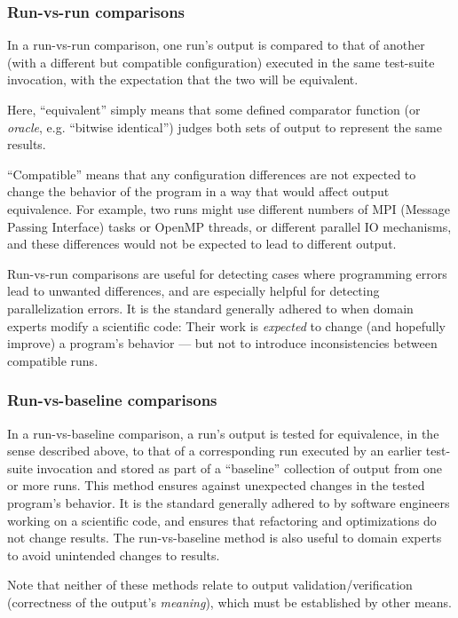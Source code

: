 \documentclass[conference]{IEEEtran}
\begin{document}
\subsubsection{Run-vs-run comparisons}

In a run-vs-run comparison, one run's output is compared to that of another (with a different but compatible configuration) executed in the same test-suite invocation, with the expectation that the two will be equivalent.

Here, ``equivalent'' simply means that some defined comparator function (or \emph{oracle}, e.g. ``bitwise identical'') judges both sets of output to represent the same results.

``Compatible'' means that any configuration differences are not expected to change the behavior of the program in a way that would affect output equivalence. For example, two runs might use different numbers of MPI (Message Passing Interface) tasks or OpenMP threads, or different parallel IO mechanisms, and these differences would not be expected to lead to different output.

Run-vs-run comparisons are useful for detecting cases where programming errors lead to unwanted differences, and are especially helpful for detecting parallelization errors. It is the standard generally adhered to when domain experts modify a scientific code: Their work is \emph{expected} to change (and hopefully improve) a program's behavior --- but not to introduce inconsistencies between compatible runs.

\subsubsection{Run-vs-baseline comparisons}

In a run-vs-baseline comparison, a run's output is tested for equivalence, in the sense described above, to that of a corresponding run executed by an earlier test-suite invocation and stored as part of a ``baseline'' collection of output from one or more runs. This method ensures against unexpected changes in the tested program's behavior. It is the standard generally adhered to by software engineers working on a scientific code, and ensures that refactoring and optimizations do not change results. The run-vs-baseline method is also useful to domain experts to avoid unintended changes to results.

Note that neither of these methods relate to output validation/verification (correctness of the output's \emph{meaning}), which must be established by other means.
\end{document}
